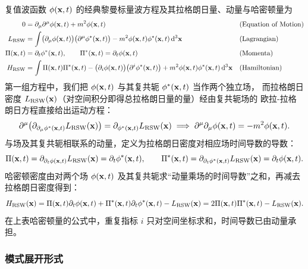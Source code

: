 复值波函数 $\phi(\mathbf{x},t)$ 的经典黎曼标量波方程及其拉格朗日量、动量与哈密顿量为
\begin{align}
0&=\partial_{\mu}\partial^{\mu}\phi(\mathbf{x},t)+m^{2}\phi(\mathbf{x},t)
&&\text{(Equation of Motion)}\\
L_{\text{RSW}}&=\int\bigl(\partial_{\mu}\phi(\mathbf{x},t)\bigr)\bigl(\partial^{\mu}\phi^{*}(\mathbf{x},t)\bigr)
-m^{2}\phi(\mathbf{x},t)\phi^{*}(\mathbf{x},t)\,\mathrm{d}^{3}\mathbf{x}
&&\text{(Lagrangian)}\\
\Pi(\mathbf{x},t)&=\partial_{t}\phi^{*}(\mathbf{x},t),\qquad
\Pi^{*}(\mathbf{x},t)=\partial_{t}\phi(\mathbf{x},t)
&&\text{(Momenta)}\\
H_{\text{RSW}}&=\int\Pi(\mathbf{x},t)\Pi^{*}(\mathbf{x},t)-\bigl(\partial_{i}\phi(\mathbf{x},t)\bigr)\bigl(\partial^{i}\phi^{*}(\mathbf{x},t)\bigr)
+m^{2}\phi(\mathbf{x},t)\phi^{*}(\mathbf{x},t)\,\mathrm{d}^{3}\mathbf{x}
&&\text{(Hamiltonian)}
\end{align}
第一组方程中，我们把 $\phi(\mathbf{x},t)$ 与其复共轭 $\phi^{*}(\mathbf{x},t)$ 当作两个独立场，
而拉格朗日密度 $L_{\text{RSW}}(\mathbf{x})$（对空间积分即得总拉格朗日量的量）经由复共轭场的
欧拉-拉格朗日方程直接给出运动方程：
\begin{equation*}
\partial^{\mu}\bigl(\partial_{\partial_{\mu}\phi^{*}(\mathbf{x},t)}L_{\text{RSW}}(\mathbf{x})\bigr)
=\partial_{\phi^{*}(\mathbf{x},t)}L_{\text{RSW}}(\mathbf{x})
\;\Longrightarrow\;
\partial^{\mu}\partial_{\mu}\phi(\mathbf{x},t)=-m^{2}\phi(\mathbf{x},t).
\end{equation*}
与场及其复共轭相联系的动量，定义为拉格朗日密度对相应场时间导数的导数：
\begin{equation*}
\Pi(\mathbf{x},t)=\partial_{\partial_{t}\phi(\mathbf{x},t)}L_{\text{RSW}}(\mathbf{x})=\partial_{t}\phi^{*}(\mathbf{x},t),
\qquad
\Pi^{*}(\mathbf{x},t)=\partial_{\partial_{t}\phi^{*}(\mathbf{x},t)}L_{\text{RSW}}(\mathbf{x})=\partial_{t}\phi(\mathbf{x},t).
\end{equation*}
哈密顿密度由对两个场 $\phi(\mathbf{x},t)$ 及其复共轭求“动量乘场的时间导数”之和，再减去拉格朗日密度得到：
\begin{equation*}
H_{\text{RSW}}(\mathbf{x})=\Pi(\mathbf{x},t)\partial_{t}\phi(\mathbf{x},t)+\Pi^{*}(\mathbf{x},t)\partial_{t}\phi^{*}(\mathbf{x},t)-L_{\text{RSW}}(\mathbf{x})
=2\Pi(\mathbf{x},t)\Pi^{*}(\mathbf{x},t)-L_{\text{RSW}}(\mathbf{x}).
\end{equation*}
在上表哈密顿量的公式中，重复指标 $i$ 只对空间坐标求和，时间导数已由动量承担。

\subsubsection*{模式展开形式}

